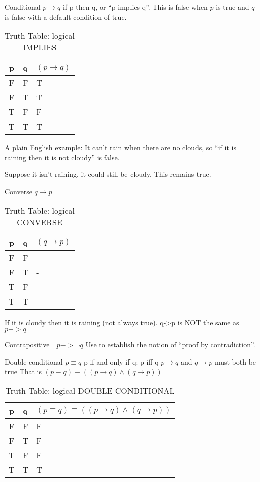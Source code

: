 Conditional $p \to q$ if p then q, or ``p implies q''. This is false when
$p$ is true and $q$ is false with a default condition of true.

\begin{table}[!htb]
\label{tab:TruthTableIMPLIES}
\begin{tabularx}{\linewidth}{| c | c | X |} \hline
  p & q & $(p \to q)$ \\ \hline \hline
  F & F & T \\ \hline
  F & T & T \\ \hline
  T & F & F \\ \hline
  T & T & T \\ \hline
\end{tabularx}
\caption{Truth Table: logical IMPLIES}
\end{table}

A plain English example: It can't rain when there are no clouds, so ``if it is
raining then it is not cloudy'' is false.

Suppose it isn't raining, it could still be cloudy. This remains true.

Converse $q \to p$
\begin{table}[!htb]
\label{tab:TruthTableCONVERSE}
\begin{tabularx}{\linewidth}{| c | c | X |} \hline
  p & q & $(q \to p)$ \\ \hline \hline
  F & F & - \\ \hline
  F & T & - \\ \hline
  T & F & - \\ \hline
  T & T & - \\ \hline
\end{tabularx}
\caption{Truth Table: logical CONVERSE}
\end{table}

If it is cloudy then it is raining (not always true).
q->p is NOT the same as $p -> q$

Contrapositive $\lnot p -> \lnot q$
Use to establish the notion of ``proof by contradiction''.

Double conditional $ p \equiv q $
p if and only if q: p iff q
$p \to q$ and $q \to p$ must both be true
That is $(p \equiv q) \equiv (( p \to q) \land (q \to p))$

\begin{table}[!htb]
\label{tab:TruthTableCONVERSE}
\begin{tabularx}{\linewidth}{| c | c | X |} \hline
  p & q & $( p \equiv q ) \equiv (( p \to q) \land (q \to p))$
                                                    \\ \hline \hline
  F & F & F \\ \hline
  F & T & F \\ \hline
  T & F & F \\ \hline
  T & T & T \\ \hline
\end{tabularx}
\caption{Truth Table: logical DOUBLE CONDITIONAL}
\end{table}


